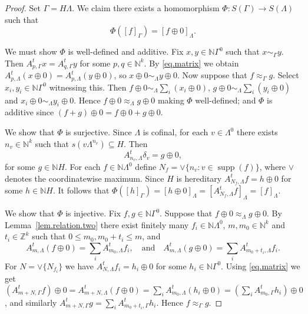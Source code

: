\documentclass[a4paper, 12pt]{amsart}
\numberwithin{equation}{section}
\theoremstyle{remark}
\theoremstyle{definition}
\begin{document}
\begin{proof}
Set $\Gamma=H\Lambda$. We claim there exists a homomorphism $\Phi\colon S(\Gamma)\to
S(\Lambda)$ such that
$$\Phi({{[{f}]_\Gamma}})={{[{f\oplus 0}]_\Lambda}}.$$

We must show $\Phi$ is well-defined and additive. Fix $x,y\in {\mathbb{N}}\Gamma^0$ such that
$x\sim_\Gamma y$. Then $A^t_{p,\Gamma}x=A^t_{q,\Gamma}y$ for some $p,q\in {\mathbb{N}}^k$. By
\eqref{eq.matrix} we obtain $A^t_{p,\Lambda}(x\oplus 0)=A^t_{p,\Lambda}(y\oplus 0)$, so
$x\oplus 0 \sim_\Lambda y\oplus 0$. Now suppose that $f\approx_\Gamma g$. Select
$x_i,y_i\in{\mathbb{N}}\Gamma^0$ witnessing this. Then $f\oplus 0 \sim_\Lambda \sum_i(x_i\oplus
0)$, $g\oplus 0 \sim_\Lambda \sum_i(y_i\oplus 0)$ and $x_i\oplus 0 \sim_\Lambda y_i
\oplus 0$. Hence  $f\oplus 0 \approx_{\Lambda} g\oplus 0$ making $\Phi$ well-defined; and $\Phi$
 is additive since $(f+g)\oplus 0=f\oplus 0+g\oplus 0$.

We show that $\Phi$ is surjective. Since $\Lambda$ is cofinal, for each $v\in \Lambda^0$
there exists $n_v\in {\mathbb{N}}^k$ such that $s(v\Lambda^{n_v})\subseteq H$. Then
$$A^t_{n_v,\Lambda}\delta_v=g\oplus 0,$$
for some $g\in{\mathbb{N}} H$. For each $f\in {\mathbb{N}}\Lambda^0$ define $N_f=\vee\{n_v: v\in {\operatorname{supp}}
(f)\}$, where $\vee$ denotes the coordinatewise maximum. Since $H$ is hereditary $A^t_{N_f,
\Lambda} f=h\oplus 0$ for some $h\in {\mathbb{N}} H$. It follows that
$\Phi({{[{h}]_\Gamma}})={{[{h\oplus 0}]_\Lambda}}={{[{A^t_{N_f,\Lambda}f}]_\Lambda}}={{[{f}]_\Lambda}}$.

We show that $\Phi$ is injective. Fix $f,g\in {\mathbb{N}}\Gamma^0$. Suppose that $f\oplus 0
\approx_{\Lambda} g\oplus 0$. By Lemma~\ref{lem.relation.two} there exist finitely many
$f_i\in  {\mathbb{N}} \Lambda^0$, $m,m_0\in {\mathbb{N}}^k$ and $t_i\in {\mathbb{Z}}^k$ such that $0\leq
m_0,m_0+t_i\leq m$, and
$$A^t_{m,\Lambda}(f\oplus 0)=\sum_iA^t_{m_0,\Lambda}f_i, \quad\text{and}\quad A^t_{m,\Lambda}(g\oplus 0)=\sum_i A^t_{m_0+t_i,\Lambda}f_i.$$
For $N=\vee \{N_{f_i}\}$ we have $A^t_{N,\Lambda}f_i=h_i\oplus 0$ for some $h_i\in {\mathbb{N}}
\Gamma^0$. Using \eqref{eq.matrix} we get $(A^t_{m+N,\Gamma}f)\oplus 0 =
A^t_{m+N,\Lambda}(f\oplus 0)=\sum_iA^t_{m_0,\Lambda}(h_i\oplus
0)=(\sum_iA^t_{m_0,\Gamma}h_i)\oplus 0$, and similarly  $A^t_{m+N,\Gamma}g =
\sum_iA^t_{m_0+t_i,\Gamma}h_i$. Hence $f\approx_\Gamma g$.
\end{proof}
\end{document}

